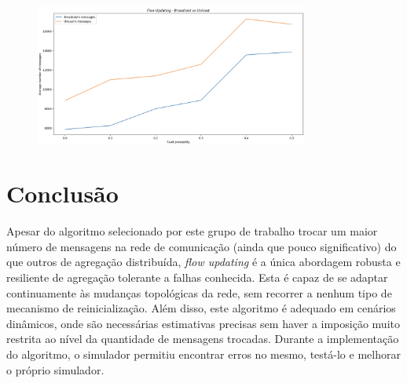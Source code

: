 \documentclass[a4paper]{report}
\begin{document}
{	\begin{figure}[H]
		\centering
		\includegraphics[width=0.8\textwidth]{Images/Plot4.png}
		\label{fig:4}
	\end{figure}
}

{\let\clearpage\relax \chapter{Conclusão} \label{ch:Conclusion}}
\large{
	Apesar do algoritmo selecionado por este grupo de trabalho trocar um maior número de mensagens na rede de comunicação (ainda que pouco significativo) do que outros de agregação distribuída, \textit{flow updating} é a única abordagem robusta e resiliente de agregação tolerante a falhas conhecida.
	Esta é capaz de se adaptar continuamente às mudanças topológicas da rede, sem recorrer a nenhum tipo de mecanismo de reinicialização. Além disso, este algoritmo é adequado em cenários dinâmicos, onde são necessárias estimativas precisas sem haver a imposição muito restrita ao nível da quantidade de mensagens trocadas.
	Durante a implementação do algoritmo, o simulador permitiu encontrar erros no mesmo, testá-lo e melhorar o próprio simulador. 
}

\printbibliography[heading=bibintoc]
\end{document}
